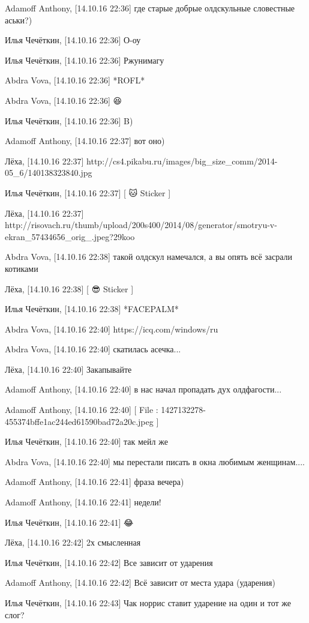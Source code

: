 Adamoff Anthony, [14.10.16 22:36]
где старые добрые олдскульные словестные аськи?)

Илья Чечёткин, [14.10.16 22:36]
О-оу

Илья Чечёткин, [14.10.16 22:36]
Ржунимагу

Abdra Vova, [14.10.16 22:36]
*ROFL*

Abdra Vova, [14.10.16 22:36]
😆

Илья Чечёткин, [14.10.16 22:36]
B)

Adamoff Anthony, [14.10.16 22:37]
вот оно)

Лёха, [14.10.16 22:37]
http://cs4.pikabu.ru/images/big_size_comm/2014-05_6/140138323840.jpg

Илья Чечёткин, [14.10.16 22:37]
[ 🐱 Sticker ]

Лёха, [14.10.16 22:37]
http://risovach.ru/thumb/upload/200s400/2014/08/generator/smotryu-v-ekran_57434656_orig_.jpeg?29koo

Abdra Vova, [14.10.16 22:38]
такой олдскул намечался, а вы опять всё засрали котиками

Лёха, [14.10.16 22:38]
[ 😎 Sticker ]

Илья Чечёткин, [14.10.16 22:38]
*FACEPALM*

Abdra Vova, [14.10.16 22:40]
https://icq.com/windows/ru

Abdra Vova, [14.10.16 22:40]
скатилась асечка...

Лёха, [14.10.16 22:40]
Закапывайте

Adamoff Anthony, [14.10.16 22:40]
в нас начал пропадать дух олдфагости...

Adamoff Anthony, [14.10.16 22:40]
[ File : 1427132278-455374bffe1ac244ed61590bad72a20c.jpeg ]

Илья Чечёткин, [14.10.16 22:40]
так мейл же

Abdra Vova, [14.10.16 22:40]
мы перестали писать в окна любимым женщинам....

Adamoff Anthony, [14.10.16 22:41]
фраза вечера)

Adamoff Anthony, [14.10.16 22:41]
недели!

Илья Чечёткин, [14.10.16 22:41]
😂

Лёха, [14.10.16 22:42]
2х смысленная

Илья Чечёткин, [14.10.16 22:42]
Все зависит от ударения

Adamoff Anthony, [14.10.16 22:42]
Всё зависит от места удара (ударения)

Илья Чечёткин, [14.10.16 22:43]
Чак норрис ставит ударение на один и тот же слог?

